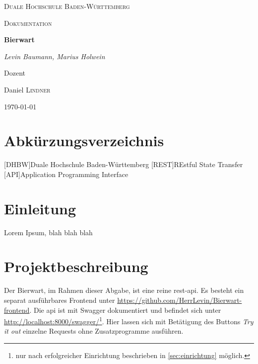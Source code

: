 \documentclass[12pt,a4paper,titlepage,ngerman,pdftex]{report}
\begin{document}
    \begin{titlepage}
        \centering
        {\scshape\LARGE Duale Hochschule Baden-Württemberg \par}
        \vspace{1cm}
        {\scshape\Large Dokumentation\par}
        \vspace{1.5cm}
        {\huge\bfseries Bierwart\par}
        \vspace{2cm}
        {\Large\itshape Levin Baumann, Marius Holwein\par}
        \vfill
        Dozent\par
        Daniel \textsc{Lindner}

        \vfill

        {\large \today\par}
    \end{titlepage}

    \tableofcontents
    \listoffigures

    \chapter*{Abkürzungsverzeichnis}
    \begin{acronym}[all]
        [DHBW]{Duale Hochschule Baden-Württemberg}
        [REST]{REstful State Transfer}
        [API]{Application Programming Interface}
    \end{acronym}
    \onehalfspacing


    \chapter{Einleitung}\label{ch:einleitung}
    Lorem Ipsum, blah blah blah


    \chapter{Projektbeschreibung}\label{ch:projektbeschreibung}
    Der Bierwart, im Rahmen dieser Abgabe, ist eine reine \ac{rest}-\ac{api}. Es besteht ein separat ausführbares Frontend unter \url{https://github.com/HerrLevin/Bierwart-frontend}.
    Die \ac{api} ist mit Swagger dokumentiert und befindet sich unter \url{http://localhost:8000/swagger/}\footnote{nur nach erfolgreicher Einrichtung beschrieben in \ref{sec:einrichtung} möglich.}.
    Hier lassen sich mit Betätigung des Buttons \textit{Try it out} einzelne Requests ohne Zusatzprogramme ausführen.
\end{document}
